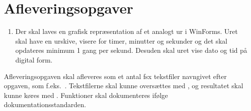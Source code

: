 \documentclass[a4paper,12pt]{article}
\begin{document}
\section*{Afleveringsopgaver}
\begin{enumerate}[label=12i.\arabic*,start=0]
\item Der skal laves en grafisk repræsentation af et analogt ur i WinForms. Uret
  skal have en urskive, visere for timer, minutter og sekunder og
  det skal opdateres minimum 1 gang per sekund. Desuden skal uret vise
  dato og tid på digital form.
\end{enumerate}

Afleveringsopgaven skal afleveres som et antal fsx tekstfiler navngivet efter opgaven, som f.eks.\ . Tekstfilerne skal kunne oversættes med , og resultatet skal kunne køres med . Funktioner skal dokumenteres ifølge dokumentationsstandarden.
\end{document}

